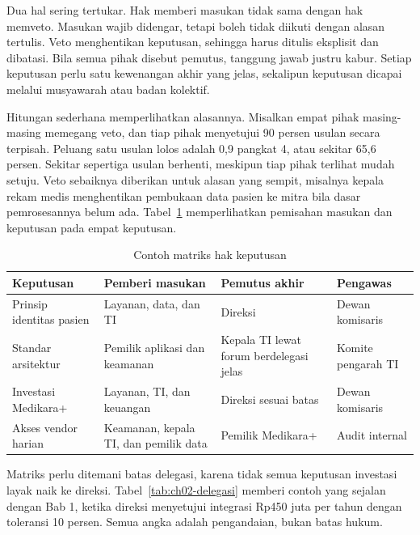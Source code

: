 Dua hal sering tertukar. Hak memberi masukan tidak sama dengan hak memveto. Masukan wajib
didengar, tetapi boleh tidak diikuti dengan alasan tertulis. Veto menghentikan keputusan,
sehingga harus ditulis eksplisit dan dibatasi. Bila semua pihak disebut pemutus, tanggung
jawab justru kabur. Setiap keputusan perlu satu kewenangan akhir yang jelas, sekalipun
keputusan dicapai melalui musyawarah atau badan kolektif.

Hitungan sederhana memperlihatkan alasannya. Misalkan empat pihak masing-masing memegang
veto, dan tiap pihak menyetujui 90 persen usulan secara terpisah. Peluang satu usulan lolos
adalah 0,9 pangkat 4, atau sekitar 65,6 persen. Sekitar sepertiga usulan berhenti, meskipun tiap
pihak terlihat mudah setuju. Veto sebaiknya diberikan untuk alasan yang sempit, misalnya
kepala rekam medis menghentikan pembukaan data pasien ke mitra bila dasar pemrosesannya belum
ada. Tabel~\ref{tab:ch02-hak} memperlihatkan pemisahan masukan dan keputusan pada empat
keputusan.

\begin{table}[!htb]
  \centering\small
  \caption{Contoh matriks hak keputusan}\label{tab:ch02-hak}
  \begin{tabularx}{\textwidth}{|>{\raggedright\arraybackslash}p{}|>{\raggedright\arraybackslash}X|>{\raggedright\arraybackslash}X|>{\raggedright\arraybackslash}p{}|}
    \hline
    \textbf{Keputusan} & \textbf{Pemberi masukan} & \textbf{Pemutus akhir} &
    \textbf{Pengawas} \\ \hline
    Prinsip identitas pasien & Layanan, data, dan TI & Direksi & Dewan komisaris \\ \hline
    Standar arsitektur & Pemilik aplikasi dan keamanan & Kepala TI lewat forum berdelegasi
    jelas & Komite pengarah TI \\ \hline
    Investasi Medikara+ & Layanan, TI, dan keuangan & Direksi sesuai batas & Dewan komisaris
    \\ \hline
    Akses vendor harian & Keamanan, kepala TI, dan pemilik data & Pemilik Medikara+ &
    Audit internal \\ \hline
  \end{tabularx}
\end{table}

Matriks perlu ditemani batas delegasi, karena tidak semua keputusan investasi layak naik ke
direksi. Tabel~\ref{tab:ch02-delegasi} memberi contoh yang sejalan dengan Bab 1, ketika direksi
menyetujui integrasi Rp450 juta per tahun dengan toleransi 10 persen. Semua angka adalah
pengandaian, bukan batas hukum.


